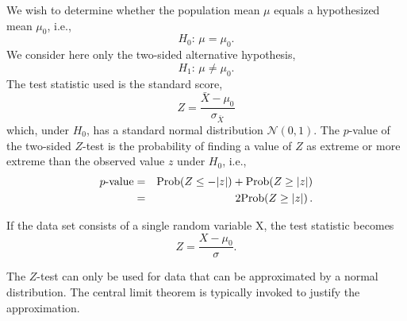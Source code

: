We wish to determine whether the population mean $\mu$ equals a hypothesized mean $\mu_0$, i.e.,
\begin{equation}
H_0: \, \mu = \mu_0.
\end{equation}
We consider here only the two-sided alternative hypothesis,
\begin{equation}
H_1: \, \mu \ne \mu_0.
\end{equation}
The test statistic used is the standard score, 
\begin{equation}\label{eq:Z}
Z = \frac{\bar{X} - \mu_0}{\sigma_{\bar{X}}}
\end{equation}
which, under $H_0$, has a standard normal distribution $\mathcal{N}(0,1)\label{eq:normal}$. The $p$-value of the two-sided $Z$-test is the probability of finding a value of $Z$ as extreme or more extreme than the observed value $z$ under $H_0$, i.e., 
\begin{eqnarray}
\text{$p$-value} &=& \text{Prob}\!\left(Z \le -\lvert z \rvert\right)
                 +\text{Prob}\!\left(Z \ge \lvert z \rvert\right) \\
               &=& 2\text{Prob}\!\left(Z \ge \lvert z \rvert\right).
\end{eqnarray}

If the data set consists of a single random variable X, the test statistic becomes 
\begin{equation}\label{eq:Z}
Z = \frac{X - \mu_0}{\sigma}.
\end{equation}

The $Z$-test can only be used for data that can be approximated by a normal distribution. The central limit theorem is typically invoked to justify the approximation. 



\clearchapter





